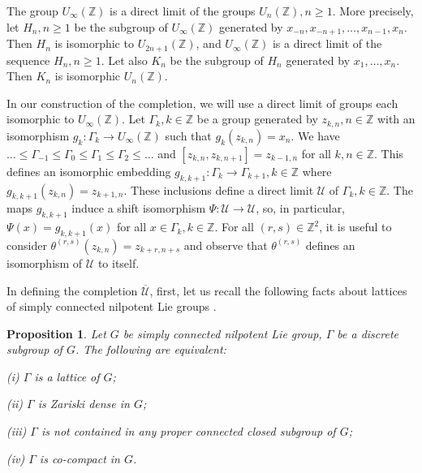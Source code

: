 \documentclass[12pt]{amsart}
\newtheorem{prop}[thm]{Proposition}
\theoremstyle{definition}
\newcommand{\blackboard}[1]{\ensuremath{\mathbb{#1}}}
\newcommand{\Z}{\blackboard{Z}}
\begin{document}
    \medskip
    
    The group $U_{\infty }(\mathbb{Z})$ is a direct limit of the groups $U_n(\mathbb{Z}), n\geq 1$. More precisely, let $H_n, n\geq 1$ be the subgroup of $U_{\infty }(\mathbb{Z})$ generated by $x_{-n}, x_{-n+1}, \dots , x_{n-1}, x_n$. Then $H_n$ is isomorphic to $U_{2n+1}(\mathbb{Z})$, and $U_{\infty }(\mathbb{Z})$ is a direct limit of the sequence $H_n, n\geq 1$. Let also $K_n$ be the subgroup of $H_n$ generated by $x_1, \dots , x_n$. Then $K_n$ is isomorphic $U_n(\mathbb{Z})$.
    
\medskip 
    
    In our construction of the completion, we will use a direct limit of groups each isomorphic to $U_{\infty }(\mathbb{Z})$. Let $\Gamma _k, k\in \mathbb{Z}$ be a group generated by $z_{k,n}, n\in \mathbb{Z}$ with an isomorphism $g_k:\Gamma _k\to U_{\infty }(\mathbb{Z})$ such that $g_k(z_{k,n}) = x_n$. We have  $\dots \leq \Gamma _{-1}\leq \Gamma _0\leq \Gamma _1\leq \Gamma _2\leq \dots $ and $[z_{k,n}, z_{k,n+1}] = z_{k-1,n}$ for all $k, n\in \mathbb{Z}$. This defines an isomorphic embedding $g_{k,k+1}:\Gamma _k\to \Gamma _{k+1}, k\in \mathbb{Z}$ where $g_{k,k+1}(z_{k,n}) = z_{k+1,n}$. These inclusions define a direct limit $\mathcal{U}$ of $\Gamma _k, k\in \mathbb{Z}$. The maps $g_{k,k+1}$ induce a shift isomorphism $\Psi  : \mathcal{U}\to \mathcal{U}$, so, in particular, $\Psi (x) = g_{k,k+1}(x)$ for all $x\in \Gamma _k, k\in \mathbb{Z}$. For all $(r,s)\in \Z^2$, it is useful to consider $\theta ^{(r,s)}(z_{k,n}) = z_{k+r,n+s}$ and observe that $\theta ^{(r,s)}$ defines an isomorphism of $\mathcal{U}$ to itself. 
    
\medskip 

    In defining the completion $\overline{\mathcal{U}}$, first, let us recall the following facts about lattices of simply connected nilpotent Lie groups \cite{R}. 

\begin{prop} Let $G$ be simply connected nilpotent Lie group, $\Gamma $ be a discrete subgroup of $G$. The following are equivalent:

 (i) $\Gamma $ is a lattice of $G$;

 (ii) $\Gamma $ is Zariski dense in $G$;

 (iii) $\Gamma $ is not contained in any proper connected closed subgroup of $G$;

 (iv) $\Gamma $ is co-compact in $G$. 
\end{prop}  
\end{document}
